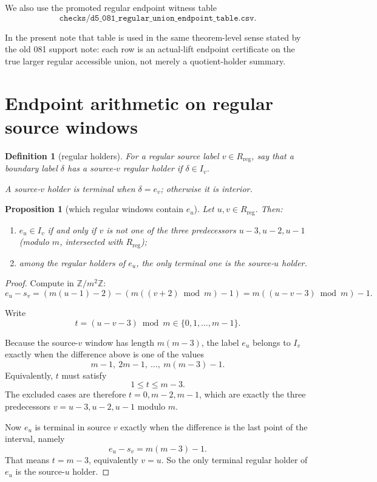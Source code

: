 \documentclass[11pt]{article}
\newtheorem{proposition}[theorem]{Proposition}
\newtheorem{definition}[theorem]{Definition}
\newcommand{\Z}{\mathbb Z}
\newcommand{\Rreg}{R_{\mathrm{reg}}}
\begin{document}
We also use the promoted regular endpoint witness table
\[
\texttt{checks/d5\_081\_regular\_union\_endpoint\_table.csv}.
\]

In the present note that table is used in the same theorem-level sense stated
by the old 081 support note: each row is an actual-lift endpoint certificate on
the true larger regular accessible union, not merely a quotient-holder summary.

\section{Endpoint arithmetic on regular source windows}

\begin{definition}[regular holders]
For a regular source label $v \in \Rreg$, say that a boundary label $\delta$
has a \emph{source-$v$ regular holder} if $\delta \in I_v$.

A source-$v$ holder is \emph{terminal} when $\delta = e_v$; otherwise it is
\emph{interior}.
\end{definition}

\begin{proposition}[which regular windows contain $e_u$]
Let $u,v \in \Rreg$. Then:
\begin{enumerate}[label=\textup{(\arabic*)},leftmargin=2.5em]
\item $e_u \in I_v$ if and only if $v$ is not one of the three predecessors
      $u-3,u-2,u-1$ (modulo $m$, intersected with $\Rreg$);
\item among the regular holders of $e_u$, the only terminal one is the
      source-$u$ holder.
\end{enumerate}
\end{proposition}

\begin{proof}
Compute in $\Z/m^2\Z$:
\[
e_u - s_v = (m(u-1)-2) - (m((v+2) \bmod m)-1)
          = m((u-v-3) \bmod m) - 1.
\]

Write
\[
t = (u-v-3) \bmod m \in \{0,1,\dots,m-1\}.
\]

Because the source-$v$ window has length $m(m-3)$, the label $e_u$ belongs to
$I_v$ exactly when the difference above is one of the values
\[
m-1,\ 2m-1,\ \dots,\ m(m-3)-1.
\]
Equivalently, $t$ must satisfy
\[
1 \le t \le m-3.
\]
The excluded cases are therefore $t=0,m-2,m-1$, which are exactly the three
predecessors $v=u-3,u-2,u-1$ modulo $m$.

Now $e_u$ is terminal in source $v$ exactly when the difference is the last
point of the interval, namely
\[
e_u - s_v = m(m-3)-1.
\]
That means $t=m-3$, equivalently $v=u$. So the only terminal regular holder of
$e_u$ is the source-$u$ holder.
\end{proof}
\end{document}
